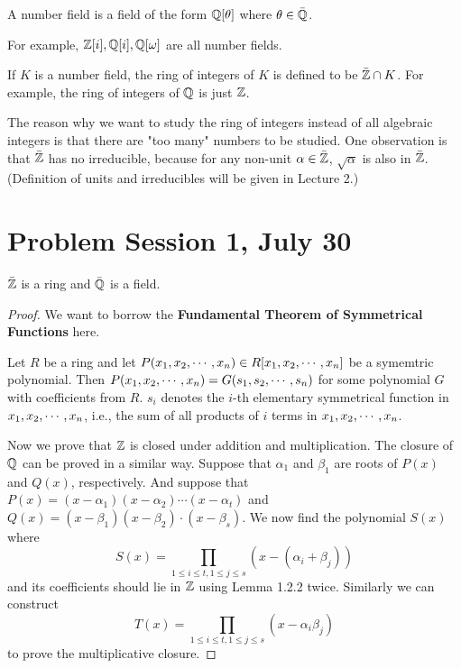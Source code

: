 \documentclass[12pt,twoside=semi,openright,numbers=noenddot]{scrbook}
\begin{document}
\begin{definition}
    A number field is a field of the form $\mathbb Q[\theta]$ where $\theta \in \bar{\mathbb Q}$.
\end{definition}
For example, $\mathbb Z[i], \mathbb Q[i], \mathbb Q[\omega]$ are all number fields.
\begin{definition}
    If $K$ is a number field, the ring of integers of $K$ is defined to be $\bar{\mathbb Z} \cap K$. For example, 
    the ring of integers of $\mathbb Q$ is just $\mathbb Z$.
\end{definition}
The reason why we want to study the ring of integers instead of all algebraic integers 
is that there are "too many" numbers to be studied. One observation is that $\bar{\mathbb Z}$ has no irreducible,
because for any non-unit $\alpha \in \bar{\mathbb Z}$, $\sqrt{\alpha}$ is also in $\bar{\mathbb Z}$. (Definition of units and irreducibles will
be given in Lecture 2.)

\newpage
\section{Problem Session 1, July 30}
\begin{problem}
    $\bar{\mathbb Z}$ is a ring and $\bar{\mathbb Q}$ is a field.
\end{problem}
    \begin{proof}
        We want to borrow the \textbf{Fundamental Theorem of Symmetrical Functions} here. \\
        \begin{lemma}
            Let $R$ be a ring and let $P({x}_1, {x}_2, \cdots, {x}_{n}) \in R[{x}_1, {x}_2, \cdots, {x}_{n}]$ be a symemtric polynomial. 
            Then $P({x}_1, {x}_2, \cdots, {x}_{n}) = G({s}_1, {s}_2, \cdots, {s}_{n})$ for some polynomial $G$ with coefficients from $R$.
            $s_i$ denotes the $i$-th elementary symmetrical function in ${x}_1, {x}_2, \cdots, {x}_{n}$, i.e., the sum of all products of $i$ terms 
            in ${x}_1, {x}_2, \cdots, {x}_{n}$.
        \end{lemma}
        Now we prove that $\mathbb Z$ is closed under addition and multiplication. The closure of $\mathbb Q$ can be proved in a similar way.
        Suppose that $\alpha_1$ and $\beta_1$ are roots of $P(x)$ and $Q(x)$, respectively. And suppose that $P(x) = (x-\alpha_1)(x-\alpha_2)\cdots(x-\alpha_t)$ and 
        $Q(x) = (x-\beta_1)(x-\beta_2)\cdot(x-\beta_s)$. We now find the polynomial $S(x)$ where
        $$ S(x) = \prod_{1\leq i \leq t, 1 \leq j \leq s} \left(x-(\alpha_i+\beta_j)\right) $$
        and its coefficients should lie in $\mathbb Z$ using Lemma 1.2.2 twice. Similarly we can construct
        $$T(x) = \prod_{1\leq i \leq t,1 \leq j \leq s} (x-\alpha_i \beta_j)$$
        to prove the multiplicative closure.
    \end{proof}
\end{document}
